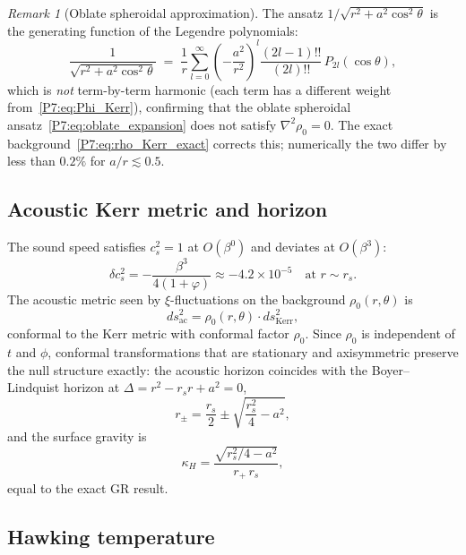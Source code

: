 \documentclass[11pt,a4paper]{article}
\theoremstyle{definition}
\theoremstyle{remark}
\newtheorem{remark}[theorem]{Remark}
\newcommand{\vp}{\varphi}
\begin{document}
\begin{remark}[Oblate spheroidal approximation]
\label{P7:rem:oblate}
The ansatz $1/\sqrt{r^2+a^2\cos^2\!\theta}$ is the generating
function of the Legendre polynomials:
\begin{equation}
  \frac{1}{\sqrt{r^2+a^2\cos^2\!\theta}}
  \;=\; \frac{1}{r}\sum_{l=0}^\infty
        \left(-\frac{a^2}{r^2}\right)^{\!l}
        \frac{(2l-1)!!}{(2l)!!}\,P_{2l}(\cos\theta),
  \label{P7:eq:oblate_expansion}
\end{equation}
which is \emph{not} term-by-term harmonic (each term has a different weight
from~\eqref{P7:eq:Phi_Kerr}), confirming that the oblate spheroidal
ansatz~\eqref{P7:eq:oblate_expansion} does not
satisfy $\nabla^2\rho_0=0$.  The exact background~\eqref{P7:eq:rho_Kerr_exact}
corrects this; numerically the two differ by less than $0.2\%$ for $a/r\lesssim0.5$.
\end{remark}

\subsection{Acoustic Kerr metric and horizon}

The sound speed satisfies $c_s^2=1$ at $O(\beta^0)$ and deviates at
$O(\beta^3)$:
\begin{equation}
  \delta c_s^2 = -\frac{\beta^3}{4(1+\vp)} \approx -4.2\times10^{-5}
  \quad\text{at }r\sim r_s.
  \label{P7:eq:delta_cs}
\end{equation}
The acoustic metric seen by $\xi$-fluctuations on the background
$\rho_0(r,\theta)$ is
\begin{equation}
  ds_{\mathrm{ac}}^2 = \rho_0(r,\theta)\cdot ds_{\mathrm{Kerr}}^2,
\end{equation}
conformal to the Kerr metric with conformal factor $\rho_0$.
Since $\rho_0$ is independent of $t$ and $\phi$, conformal
transformations that are stationary and axisymmetric preserve the
null structure exactly: the acoustic horizon coincides with
the Boyer--Lindquist horizon at $\Delta=r^2-r_s r+a^2=0$,
\begin{equation}
  r_\pm = \frac{r_s}{2}\pm\sqrt{\frac{r_s^2}{4}-a^2},
\end{equation}
and the surface gravity is
\begin{equation}
  \kappa_H = \frac{\sqrt{r_s^2/4-a^2}}{r_+\,r_s},
\end{equation}
equal to the exact GR result.

\subsection{Hawking temperature}
\end{document}
